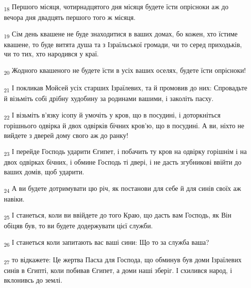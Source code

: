 \begin{tcolorbox}
\textsubscript{18} Першого місяця, чотирнадцятого дня місяця будете їсти опрісноки аж до вечора дня двадцять першого того ж місяця.
\end{tcolorbox}
\begin{tcolorbox}
\textsubscript{19} Сім день квашене не буде знаходитися в ваших домах, бо кожен, хто їстиме квашене, то буде витята душа та з Ізраїльської громади, чи то серед приходьків, чи то тих, хто народився у краї.
\end{tcolorbox}
\begin{tcolorbox}
\textsubscript{20} Жодного квашеного не будете їсти в усіх ваших оселях, будете їсти опрісноки!
\end{tcolorbox}
\begin{tcolorbox}
\textsubscript{21} І покликав Мойсей усіх старших Ізраїлевих, та й промовив до них: Спровадьте й візьміть собі дрібну худобину за родинами вашими, і заколіть пасху.
\end{tcolorbox}
\begin{tcolorbox}
\textsubscript{22} І візьміть в'язку ісопу й умочіть у кров, що в посудині, і доторкніться горішнього одвірка й двох одвірків бічних кров'ю, що в посудині. А ви, ніхто не вийдете з дверей дому свого аж до ранку!
\end{tcolorbox}
\begin{tcolorbox}
\textsubscript{23} І перейде Господь ударити Єгипет, і побачить ту кров на одвірку горішнім і на двох одвірках бічних, і обмине Господь ті двері, і не дасть згубникові ввійти до ваших домів, щоб ударити.
\end{tcolorbox}
\begin{tcolorbox}
\textsubscript{24} А ви будете дотримувати цю річ, як постанови для себе й для синів своїх аж навіки.
\end{tcolorbox}
\begin{tcolorbox}
\textsubscript{25} І станеться, коли ви ввійдете до того Краю, що дасть вам Господь, як Він обіцяв був, то ви будете додержувати цієї служби.
\end{tcolorbox}
\begin{tcolorbox}
\textsubscript{26} І станеться коли запитають вас ваші сини: Що то за служба ваша?
\end{tcolorbox}
\begin{tcolorbox}
\textsubscript{27} то відкажете: Це жертва Пасха для Господа, що обминув був доми Ізраїлевих синів в Єгипті, коли побивав Єгипет, а доми наші зберіг. І схилився народ, і вклонивсь до землі.
\end{tcolorbox}

